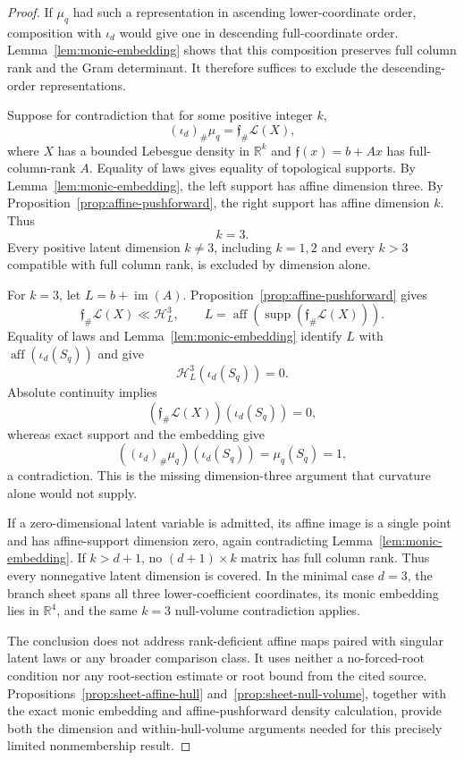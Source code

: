\begin{proof}
If $\mu_q$ had such a representation in ascending lower-coordinate order,
composition with $\iota_d$ would give one in descending full-coordinate
order.  Lemma~\ref{lem:monic-embedding} shows that this composition
preserves full column rank and the Gram determinant.  It therefore
suffices to exclude the descending-order representations.

Suppose for contradiction that for some positive integer $k$,
\[
(\iota_d)_\#\mu_q=\mathfrak f_\#\mathcal L(X),
\]
where $X$ has a bounded Lebesgue density in $\mathbb R^k$ and
$\mathfrak f(x)=b+Ax$ has full-column-rank $A$.  Equality of laws gives
equality of topological supports.  By Lemma~\ref{lem:monic-embedding},
the left support has affine dimension three.  By
Proposition~\ref{prop:affine-pushforward}, the right support has affine
dimension $k$.  Thus
\[
k=3.
\]
Every positive latent dimension $k\neq3$, including $k=1,2$ and every
$k>3$ compatible with full column rank, is excluded by dimension alone.

For $k=3$, let $L=b+\operatorname{im}(A)$.  Proposition~\ref{prop:affine-pushforward}
gives
\[
\mathfrak f_\#\mathcal L(X)\ll\mathcal H_L^3,
\qquad
L=\operatorname{aff}(\operatorname{supp}
(\mathfrak f_\#\mathcal L(X))).
\]
Equality of laws and Lemma~\ref{lem:monic-embedding} identify $L$ with
$\operatorname{aff}(\iota_d(S_q))$ and give
\[
\mathcal H_L^3(\iota_d(S_q))=0.
\]
Absolute continuity implies
\[
(\mathfrak f_\#\mathcal L(X))(\iota_d(S_q))=0,
\]
whereas exact support and the embedding give
\[
((\iota_d)_\#\mu_q)(\iota_d(S_q))=\mu_q(S_q)=1,
\]
a contradiction.  This is the missing dimension-three argument that
curvature alone would not supply.

If a zero-dimensional latent variable is admitted, its affine image is a
single point and has affine-support dimension zero, again contradicting
Lemma~\ref{lem:monic-embedding}.  If $k>d+1$, no
$(d+1)\times k$ matrix has full column rank.  Thus every nonnegative
latent dimension is covered.  In the minimal case $d=3$, the branch
sheet spans all three lower-coefficient coordinates, its monic embedding
lies in $\mathbb R^4$, and the same $k=3$ null-volume contradiction
applies.

The conclusion does not address rank-deficient affine maps paired with
singular latent laws or any broader comparison class.  It uses neither a
no-forced-root condition nor any root-section estimate or root bound from
the cited source.  Propositions~\ref{prop:sheet-affine-hull}
and~\ref{prop:sheet-null-volume}, together with the exact monic embedding
and affine-pushforward density calculation, provide both the dimension
and within-hull-volume arguments needed for this precisely limited
nonmembership result.
\end{proof}

